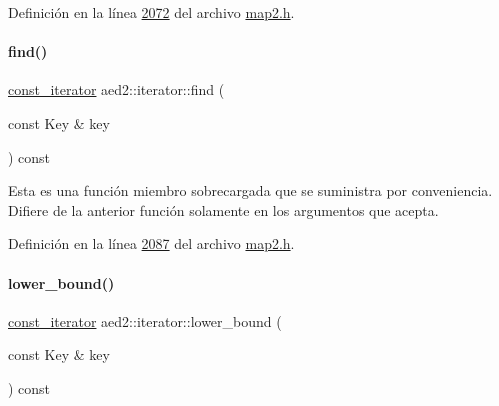 Definición en la línea \hyperlink{map2_8h_source_l02072}{2072} del archivo \hyperlink{map2_8h_source}{map2.\+h}.

\mbox{\label{classaed2_1_1iterator_a21b4a52c60fc70ef482e174325e8fec5_a21b4a52c60fc70ef482e174325e8fec5}} 
\paragraph{\texorpdfstring{find()}{find()}\hspace{0.1cm}{\footnotesize\ttfamily [2/2]}}
{\footnotesize\ttfamily \hyperlink{classaed2_1_1iterator_1_1const__iterator}{const\+\_\+iterator} aed2\+::iterator\+::find (\begin{DoxyParamCaption}\item[{const Key \&}]{key }\end{DoxyParamCaption}) const\hspace{0.3cm}{\ttfamily [inline]}}

Esta es una función miembro sobrecargada que se suministra por conveniencia. Difiere de la anterior función solamente en los argumentos que acepta. 

Definición en la línea \hyperlink{map2_8h_source_l02087}{2087} del archivo \hyperlink{map2_8h_source}{map2.\+h}.

\mbox{\label{classaed2_1_1iterator_aa7366926b6328e4f2e80484944408cbc_aa7366926b6328e4f2e80484944408cbc}} 
\paragraph{\texorpdfstring{lower\+\_\+bound()}{lower\_bound()}\hspace{0.1cm}{\footnotesize\ttfamily [1/2]}}
{\footnotesize\ttfamily \hyperlink{classaed2_1_1iterator_1_1const__iterator}{const\+\_\+iterator} aed2\+::iterator\+::lower\+\_\+bound (\begin{DoxyParamCaption}\item[{const Key \&}]{key }\end{DoxyParamCaption}) const\hspace{0.3cm}{\ttfamily [inline]}}



